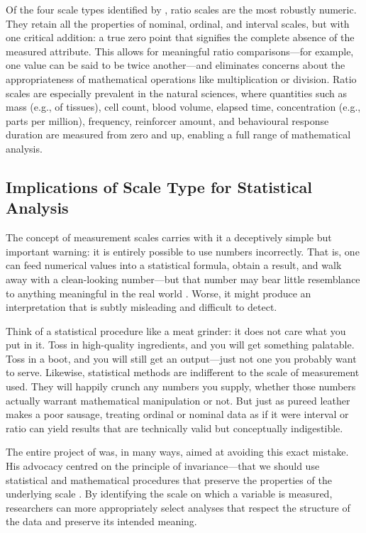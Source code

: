Of the four scale types identified by \textcite{Stevens1946}, ratio scales are the most robustly numeric. They retain all the properties of nominal, ordinal, and interval scales, but with one critical addition: a true zero point that signifies the complete absence of the measured attribute. This allows for meaningful ratio comparisons—for example, one value can be said to be twice another—and eliminates concerns about the appropriateness of mathematical operations like multiplication or division. Ratio scales are especially prevalent in the natural sciences, where quantities such as mass (e.g., of tissues), cell count, blood volume, elapsed time, concentration (e.g., parts per million), frequency, reinforcer amount, and behavioural response duration are measured from zero and up, enabling a full range of mathematical analysis.


\subsection{Implications of Scale Type for Statistical Analysis}

The concept of measurement scales carries with it a deceptively simple but important warning: it is entirely possible to use numbers incorrectly. That is, one can feed numerical values into a statistical formula, obtain a result, and walk away with a clean-looking number—but that number may bear little resemblance to anything meaningful in the real world \parencite{Roberts1985}. Worse, it might produce an interpretation that is subtly misleading and difficult to detect.

Think of a statistical procedure like a meat grinder: it does not care what you put in it. Toss in high-quality ingredients, and you will get something palatable. Toss in a boot, and you will still get an output—just not one you probably want to serve. Likewise, statistical methods are indifferent to the scale of measurement used. They will happily crunch any numbers you supply, whether those numbers actually warrant mathematical manipulation or not. But just as pureed leather makes a poor sausage, treating ordinal or nominal data as if it were interval or ratio can yield results that are technically valid but conceptually indigestible.

The entire project of \textcite{Stevens1946} was, in many ways, aimed at avoiding this exact mistake. His advocacy centred on the principle of invariance—that we should use statistical and mathematical procedures that preserve the properties of the underlying scale \parencite{Stevens1968}. By identifying the scale on which a variable is measured, researchers can more appropriately select analyses that respect the structure of the data and preserve its intended meaning.


